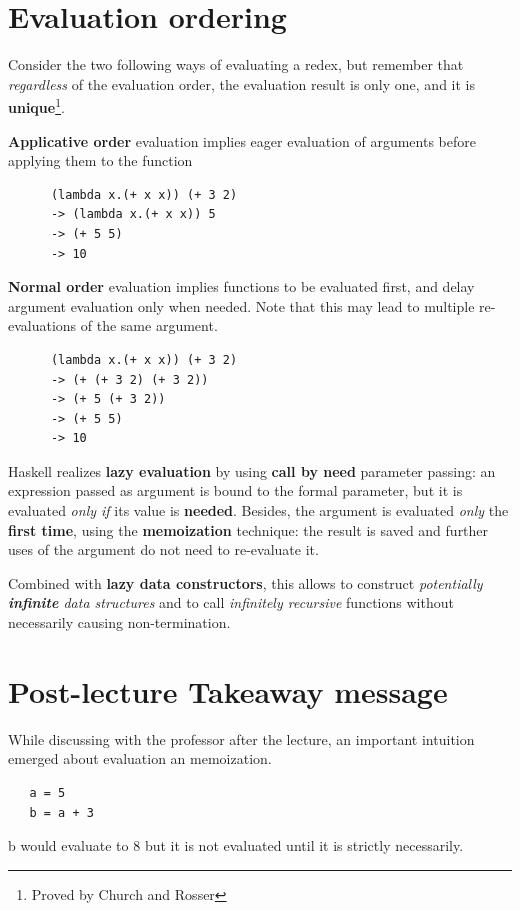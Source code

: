 \section{Evaluation ordering}
Consider the two following ways of evaluating a redex,
but remember that \textit{regardless} of the evaluation order,
the evaluation result is only one,
and it is \textbf{unique}\footnote{Proved by Church and Rosser}.
\begin{paracol}{2}
   \textbf{Applicative order} evaluation implies eager evaluation of arguments before applying them to the function
   \begin{lstlisting}
      (lambda x.(+ x x)) (+ 3 2)
      -> (lambda x.(+ x x)) 5
      -> (+ 5 5)
      -> 10
   \end{lstlisting}

   \switchcolumn
   \textbf{Normal order} evaluation implies functions to be evaluated first,
   and delay argument evaluation only when needed.
   Note that this may lead to multiple re-evaluations of the same argument.
   \begin{lstlisting}
      (lambda x.(+ x x)) (+ 3 2)
      -> (+ (+ 3 2) (+ 3 2))
      -> (+ 5 (+ 3 2))
      -> (+ 5 5)
      -> 10
   \end{lstlisting}
\end{paracol}

Haskell realizes \textbf{lazy evaluation} by using \textbf{call by need} parameter passing: 
an expression passed as
argument is bound to the formal parameter, but it is
evaluated \textit{only if} its value is \textbf{needed}.
Besides, 
the argument is evaluated \textit{only} the \textbf{first time}, using
the \textbf{memoization} technique: the result is saved and
further uses of the argument do not need to re-evaluate it.

Combined with \textbf{lazy data constructors}, this allows to
construct \textit{potentially \textbf{infinite} data structures} and to call
\textit{infinitely recursive} functions without necessarily causing non-termination.

\section{Post-lecture Takeaway message}
While discussing with the professor after the lecture,
an important intuition emerged about evaluation an memoization.
\begin{lstlisting}
   a = 5
   b = a + 3
\end{lstlisting}
b would evaluate to 8 but it is not evaluated until it is strictly necessarily.

